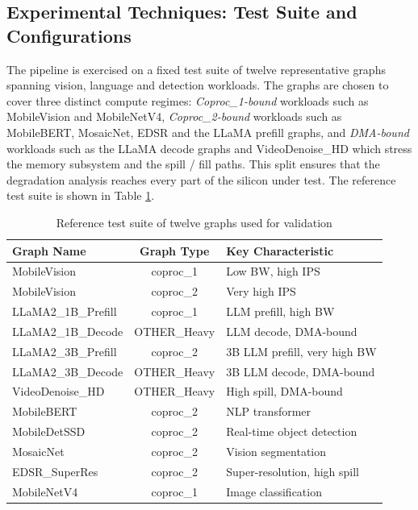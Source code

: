 \subsection{Experimental Techniques: Test Suite and Configurations}
\label{sec:params}
The pipeline is exercised on a fixed test suite of twelve representative graphs spanning vision, language and detection workloads. The graphs are chosen to cover three distinct compute regimes: \textit{Coproc\_1-bound} workloads such as MobileVision and MobileNetV4, \textit{Coproc\_2-bound} workloads such as MobileBERT, MosaicNet, EDSR and the LLaMA prefill graphs, and \textit{DMA-bound} workloads such as the LLaMA decode graphs and VideoDenoise\_HD which stress the memory subsystem and the spill / fill paths. This split ensures that the degradation analysis reaches every part of the silicon under test. The reference test suite is shown in Table \ref{tab:testsuite}.

\begin{table}[htb]
\fontsize{10}{12}\selectfont
\centering
\caption{Reference test suite of twelve graphs used for validation}
\label{tab:testsuite}
\begin{tabular}{|p{4cm}|c|p{6cm}|}
\hline
\textbf{Graph Name} & \textbf{Graph Type} & \textbf{Key Characteristic}\\
\hline
MobileVision & coproc\_1 & Low BW, high IPS\\\hline
MobileVision & coproc\_2 & Very high IPS\\\hline
LLaMA2\_1B\_Prefill & coproc\_1 & LLM prefill, high BW\\\hline
LLaMA2\_1B\_Decode & OTHER\_Heavy & LLM decode, DMA-bound\\\hline
LLaMA2\_3B\_Prefill & coproc\_2 & 3B LLM prefill, very high BW\\\hline
LLaMA2\_3B\_Decode & OTHER\_Heavy & 3B LLM decode, DMA-bound\\\hline
VideoDenoise\_HD & OTHER\_Heavy & High spill, DMA-bound\\\hline
MobileBERT & coproc\_2 & NLP transformer\\\hline
MobileDetSSD & coproc\_2 & Real-time object detection\\\hline
MosaicNet & coproc\_2 & Vision segmentation\\\hline
EDSR\_SuperRes & coproc\_2 & Super-resolution, high spill\\\hline
MobileNetV4 & coproc\_1 & Image classification\\
\hline
\end{tabular}
\end{table}

